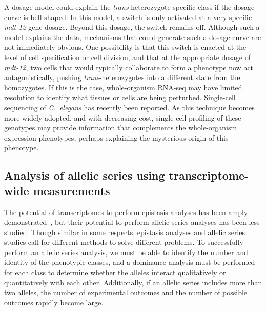 \documentclass[10pt, twocolumn]{article}
\newcommand{\cel}{\emph{C.~elegans}}
\newcommand{\gene}[1]{\mbox{\emph{#1}}}
\newcommand{\dpy}{\gene{mdt-12}}
\begin{document}
A dosage model could explain the \emph{trans}-heterozygote specific class if the
dosage curve is bell-shaped. In this model, a switch is only activated at a very
specific \dpy{} gene dosage. Beyond this dosage, the switch remains off.
Although such a model explains the data, mechanisms that could generate such a
dosage curve are not immediately obvious. One possibility is that this switch is
enacted at the level of cell specification or cell division, and that at the
appropriate dosage of \dpy{}, two cells that would typically collaborate to form
a phenotype now act antagonistically, pushing \emph{trans}-heterozygotes into a
different state from the homozygotes. If this is the case, whole-organism
RNA-seq may have limited resolution to identify what tissues or cells are being
perturbed. Single-cell sequencing of \cel{} has recently been reported. As this
technique becomes more widely adopted, and with decreasing cost, single-cell
profiling of these genotypes may provide information that complements the
whole-organism expression phenotypes, perhaps explaining the mysterious origin
of this phenotype.

\subsection*{Analysis of allelic series using transcriptome-wide measurements}
The potential of transcriptomes to perform epistasis analyses has been amply
demonstrated~\cite{Dixit2016,Angeles-Albores2017}, but their potential to
perform allelic series analyses has been less studied. Though similar in some
respects, epistasis analyses and allelic series studies call for different
methods to solve different problems. To successfully perform an allelic series
analysis, we must be able to identify the number and identity of the phenotypic
classes, and a dominance analysis must be performed for each class to determine
whether the alleles interact qualitatively or quantitatively with each other.
Additionally, if an allelic series includes more than two alleles, the number of
experimental outcomes and the number of possible outcomes rapidly become large.
\end{document}
